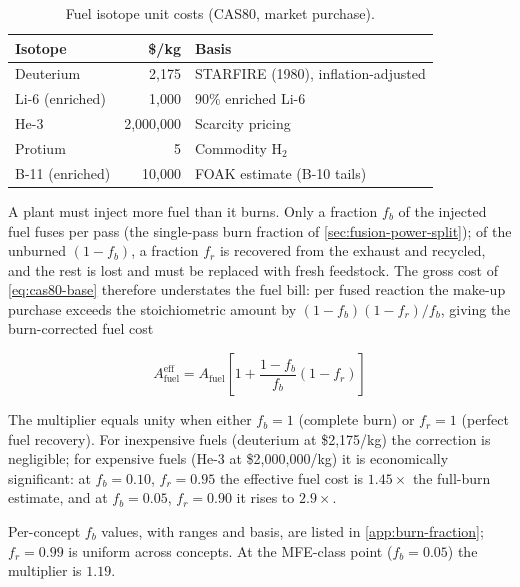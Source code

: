 \documentclass{article}
\begin{document}
\begin{table}[htbp]
\caption{Fuel isotope unit costs (CAS80, market purchase).}
\label{tab:fuel-prices}
\centering
\begin{tabular}{lrl}
\toprule
Isotope & \$/kg & Basis \\
\midrule
Deuterium & 2{,}175 & STARFIRE (1980), inflation-adjusted \\
Li-6 (enriched) & 1{,}000 & 90\% enriched Li-6 \\
He-3 & 2{,}000{,}000 & Scarcity pricing \\
Protium & 5 & Commodity H$_2$ \\
B-11 (enriched) & 10{,}000 & FOAK estimate (B-10 tails) \\
\bottomrule
\end{tabular}
\end{table}

A plant must inject more fuel than it burns. Only a fraction $f_b$ of the
injected fuel fuses per pass (the single-pass burn fraction of
\cref{sec:fusion-power-split}); of the unburned $(1-f_b)$, a fraction
$f_r$ is recovered from the exhaust and recycled, and the rest is lost
and must be replaced with fresh feedstock. The gross cost of
\cref{eq:cas80-base} therefore understates the fuel bill: per fused
reaction the make-up purchase exceeds the stoichiometric amount by
$(1-f_b)(1-f_r)/f_b$, giving the burn-corrected fuel cost

\begin{equation}
\label{eq:cas80-burn}
A_{\text{fuel}}^{\text{eff}} = A_{\text{fuel}} \left[
  1 + \frac{1 - f_b}{f_b}\left(1 - f_r\right)
\right]
\end{equation}

\noindent The multiplier equals unity when either $f_b = 1$ (complete
burn) or $f_r = 1$ (perfect fuel recovery). For inexpensive fuels
(deuterium at \$2{,}175/kg) the correction is negligible; for expensive
fuels (He-3 at \$2{,}000{,}000/kg) it is economically significant: at
$f_b = 0.10$, $f_r = 0.95$ the effective fuel cost is $1.45\times$ the
full-burn estimate, and at $f_b = 0.05$, $f_r = 0.90$ it rises to
$2.9\times$.

Per-concept $f_b$ values, with ranges and basis, are listed in
\cref{app:burn-fraction}; $f_r = 0.99$ is uniform across concepts. At the
MFE-class point ($f_b = 0.05$) the multiplier is $1.19$.
\end{document}
